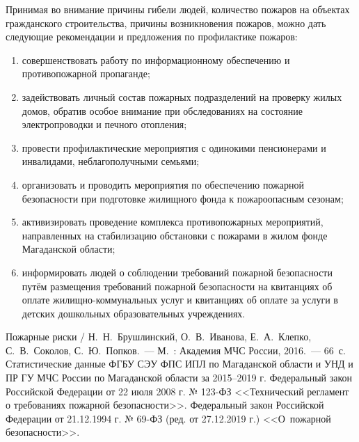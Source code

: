 Принимая во внимание причины гибели людей, количество пожаров на объектах гражданского строительства, причины возникновения пожаров, можно дать следующие рекомендации и предложения по профилактике пожаров:
\begin{enumerate}[noitemsep]\vspace{-8pt}
  \item совершенствовать работу по информационному обеспечению и противопожарной пропаганде;
  \item задействовать личный состав пожарных подразделений на проверку жилых домов, обратив особое внимание при обследованиях на состояние электропроводки и печного отопления;
  \item провести профилактические мероприятия с одинокими пенсионерами и инвалидами, неблагополучными семьями;
  \item организовать и проводить мероприятия по обеспечению пожарной безопасности при подготовке жилищного фонда к пожароопасным сезонам;
  \item активизировать проведение комплекса противопожарных мероприятий, направленных на стабилизацию обстановки с пожарами в жилом фонде Магаданской области;
  \item информировать людей о соблюдении требований пожарной безопасности путём размещения требований пожарной безопасности на квитанциях об оплате жилищно-коммунальных услуг и квитанциях об оплате за услуги в детских дошкольных образовательных учреждениях.
\end{enumerate}
\vspace{-8pt}

\begin{thebibliography}{99}
\bibitem{}Пожарные риски / Н.~Н.~Брушлинский, О.~В.~Иванова, Е.~А.~Клепко, С.~В.~Соколов, С.~Ю.~Попков.~--- М.~: Академия МЧС России, 2016.~--- 66~с.
\bibitem{}Статистические данные ФГБУ СЭУ ФПС ИПЛ по Магаданской области и УНД и ПР ГУ МЧС России по Магаданской области за 2015--2019 г.
\bibitem{}Федеральный закон Российской Федерации от 22 июля 2008 г. № 123-ФЗ  <<Технический регламент о требованиях пожарной безопасности>>.
\bibitem{}Федеральный закон Российской Федерации от 21.12.1994 г. № 69-ФЗ (ред. от 27.12.2019 г.) <<О~пожарной безопасности>>.
\end{thebibliography}

